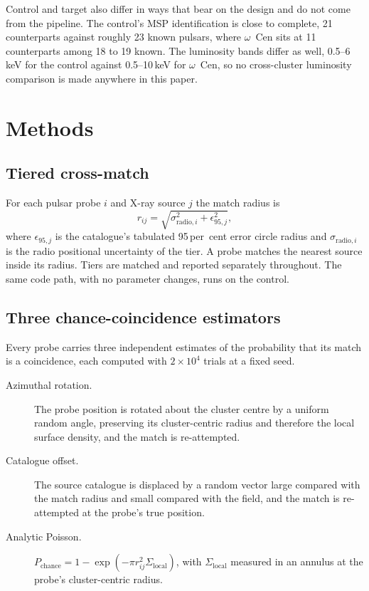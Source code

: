 \documentclass[11pt]{article}
\newcommand{\ocen}{$\omega$~Cen}
\newcommand{\pchance}{\ensuremath{P_{\mathrm{chance}}}}
\begin{document}
Control and target also differ in ways that bear on the design and do not come from the pipeline. The control's MSP identification is close to complete, 21 counterparts against roughly 23 known pulsars, where \ocen{} sits at 11 counterparts among 18 to 19 known. The luminosity bands differ as well, 0.5--6\,keV for the control against 0.5--10\,keV for \ocen, so no cross-cluster luminosity comparison is made anywhere in this paper.

\section{Methods}
\label{sec:method}

\subsection{Tiered cross-match}
\label{sec:method-match}

For each pulsar probe $i$ and X-ray source $j$ the match radius is
\begin{equation}
r_{ij} = \sqrt{\sigma_{\mathrm{radio},i}^{2} + \epsilon_{95,j}^{2}},
\end{equation}
where $\epsilon_{95,j}$ is the catalogue's tabulated 95\,per~cent error circle radius and $\sigma_{\mathrm{radio},i}$ is the radio positional uncertainty of the tier. A probe matches the nearest source inside its radius. Tiers are matched and reported separately throughout. The same code path, with no parameter changes, runs on the control.

\subsection{Three chance-coincidence estimators}
\label{sec:method-chance}

Every probe carries three independent estimates of the probability that its match is a coincidence, each computed with $2\times10^{4}$ trials at a fixed seed.

\begin{description}
\item[Azimuthal rotation.] The probe position is rotated about the cluster centre by a uniform random angle, preserving its cluster-centric radius and therefore the local surface density, and the match is re-attempted.
\item[Catalogue offset.] The source catalogue is displaced by a random vector large compared with the match radius and small compared with the field, and the match is re-attempted at the probe's true position.
\item[Analytic Poisson.] $\pchance = 1 - \exp(-\pi r_{ij}^{2}\Sigma_{\mathrm{local}})$, with $\Sigma_{\mathrm{local}}$ measured in an annulus at the probe's cluster-centric radius.
\end{description}
\end{document}
